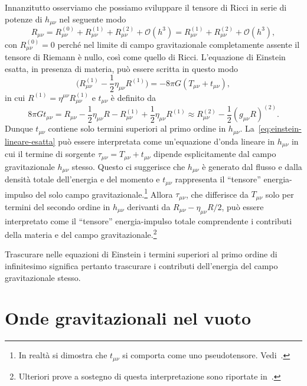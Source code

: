 Innanzitutto osserviamo che possiamo sviluppare il tensore di Ricci in serie di
potenze di $h_{\mu\nu}$ nel seguente modo
\begin{equation}
  R_{\mu\nu} = R_{\mu\nu}^{(0)} + R_{\mu\nu}^{(1)} + R_{\mu\nu}^{(2)} +
  \mathcal{O}(h^{3}) = R_{\mu\nu}^{(1)} + R_{\mu\nu}^{(2)} + \mathcal{O}(h^{3}),
\end{equation}
con $R_{\mu\nu}^{(0)} = 0$ perché nel limite di campo gravitazionale
completamente assente il tensore di Riemann è nullo, così come quello di Ricci.
L'equazione di Einstein esatta, in presenza di materia, può essere scritta in
questo modo
\begin{equation}
  \label{eq:einstein-lineare-esatta}
  \bigg(R_{\mu\nu}^{(1)} - \frac{1}{2}\eta_{\mu\nu}R^{(1)}\bigg) = -8\pi
  G(T_{\mu\nu} + t_{\mu\nu}),
\end{equation}
in cui $R^{(1)} = \eta^{\mu\nu}R_{\mu\nu}^{(1)}$ e $t_{\mu\nu}$ è definito da
\begin{equation}
  8\pi G t_{\mu\nu} = R_{\mu\nu} - \frac{1}{2}\eta_{\mu\nu} R - R_{\mu\nu}^{(1)}
  + \frac{1}{2}\eta_{\mu\nu}R^{(1)} \approx R_{\mu\nu}^{(2)} -
  \frac{1}{2}(g_{\mu\nu}R)^{(2)}.
\end{equation}
Dunque $t_{\mu\nu}$ contiene solo termini superiori al primo ordine in
$h_{\mu\nu}$.  La~\eqref{eq:einstein-lineare-esatta} può essere interpretata
come un'equazione d'onda lineare in $h_{\mu\nu}$ in cui il termine di sorgente
$\tau_{\mu\nu} = T_{\mu\nu} + t_{\mu\nu}$ dipende esplicitamente dal campo
gravitazionale $h_{\mu\nu}$ stesso.  Questo ci suggerisce che $h_{\mu\nu}$ è
generato dal flusso e dalla densità totale dell'energia e del momento e
$t_{\mu\nu}$ rappresenta il ``tensore'' energia-impulso del solo campo
gravitazionale.\footnote{In realtà si dimostra che $t_{\mu\nu}$ si comporta come
  uno pseudotensore.  Vedi~\textcite[367-374]{landau:campi}.}
Allora $\tau_{\mu\nu}$, che differisce da $T_{\mu\nu}$ solo per termini del
secondo ordine in $h_{\mu\nu}$ derivanti da $R_{\mu\nu} - \eta_{\mu\nu}R/2$, può
essere interpretato come il ``tensore'' energia-impulso totale comprendente i
contributi della materia e del campo
gravitazionale.\footnote{Ulteriori prove a sostegno di questa interpretazione
  sono riportate in~\textcite[165-171]{weinberg:gravitation}.}

Trascurare nelle equazioni di Einstein i termini superiori al primo ordine di
infinitesimo significa pertanto trascurare i contributi dell'energia del campo
gravitazionale stesso.

\section{Onde gravitazionali nel vuoto}
\label{sec:onde-grav-vuoto}

